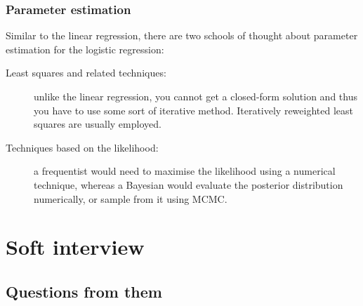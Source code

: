 \documentclass[a4paper]{article}
\begin{document}
\subsubsection{Parameter estimation}

Similar to the linear regression, there are two schools of thought about parameter estimation for the logistic regression:
\begin{description}
  \item[Least squares and related techniques:]
    unlike the linear regression, you cannot get a closed-form solution and thus you have to use some sort of iterative method. Iteratively reweighted least squares are usually employed.
  \item[Techniques based on the likelihood:]
  a frequentist would need to maximise the likelihood using a numerical technique, whereas a Bayesian would evaluate the posterior distribution numerically, or sample from it using MCMC.
\end{description}



\section{Soft interview}

\subsection{Questions from them}
\end{document}
